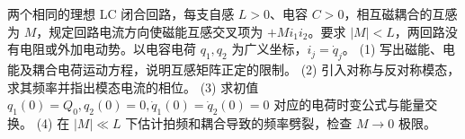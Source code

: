 两个相同的理想 LC 闭合回路，每支自感 \(L>0\)、电容 \(C>0\)，相互磁耦合的互感为 \(M\)，规定回路电流方向使磁能互感交叉项为 \(+Mi_1i_2\)。要求 \(|M|<L\)，两回路没有电阻或外加电动势。以电容电荷 \(q_1,q_2\) 为广义坐标，\(i_j=\dot q_j\)。
(1) 写出磁能、电能及耦合电荷运动方程，说明互感矩阵正定的限制。
(2) 引入对称与反对称模态，求其频率并指出模态电流的相位。
(3) 求初值 \(q_1(0)=Q_0,q_2(0)=0,\dot q_1(0)=\dot q_2(0)=0\) 对应的电荷时变公式与能量交换。
(4) 在 \(|M|\ll L\) 下估计拍频和耦合导致的频率劈裂，检查 \(M\to0\) 极限。
